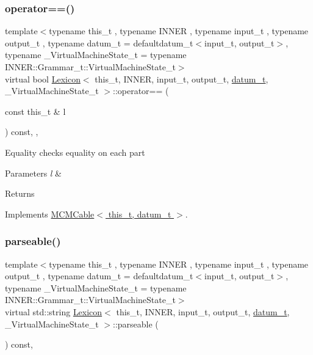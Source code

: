 \mbox{\label{class_lexicon_a04bde89f87b53ea3b283149f159dd35f}} 
\subsubsection{\texorpdfstring{operator==()}{operator==()}}
{\footnotesize\ttfamily template$<$typename this\+\_\+t , typename I\+N\+N\+ER , typename input\+\_\+t , typename output\+\_\+t , typename datum\+\_\+t  = defaultdatum\+\_\+t$<$input\+\_\+t, output\+\_\+t$>$, typename \+\_\+\+Virtual\+Machine\+State\+\_\+t  = typename I\+N\+N\+E\+R\+::\+Grammar\+\_\+t\+::\+Virtual\+Machine\+State\+\_\+t$>$ \\
virtual bool \hyperlink{class_lexicon}{Lexicon}$<$ this\+\_\+t, I\+N\+N\+ER, input\+\_\+t, output\+\_\+t, \hyperlink{class_bayesable_a9f1a6c0cd7855550fa10b1a8f13a5867}{datum\+\_\+t}, \+\_\+\+Virtual\+Machine\+State\+\_\+t $>$\+::operator== (\begin{DoxyParamCaption}\item[{const this\+\_\+t \&}]{l }\end{DoxyParamCaption}) const\hspace{0.3cm}{\ttfamily [inline]}, {\ttfamily [override]}, {\ttfamily [virtual]}}

Equality checks equality on each part 
\begin{DoxyParams}{Parameters}
{\em l} & \\
\hline
\end{DoxyParams}
\begin{DoxyReturn}{Returns}

\end{DoxyReturn}


Implements \hyperlink{class_m_c_m_cable_a7b35c04d3d1326b930cfc69dfe0bd207}{M\+C\+M\+Cable$<$ this\+\_\+t, datum\+\_\+t $>$}.

\mbox{\label{class_lexicon_aee7952473269abe7fc1cc0e2b96b8307}} 
\subsubsection{\texorpdfstring{parseable()}{parseable()}}
{\footnotesize\ttfamily template$<$typename this\+\_\+t , typename I\+N\+N\+ER , typename input\+\_\+t , typename output\+\_\+t , typename datum\+\_\+t  = defaultdatum\+\_\+t$<$input\+\_\+t, output\+\_\+t$>$, typename \+\_\+\+Virtual\+Machine\+State\+\_\+t  = typename I\+N\+N\+E\+R\+::\+Grammar\+\_\+t\+::\+Virtual\+Machine\+State\+\_\+t$>$ \\
virtual std\+::string \hyperlink{class_lexicon}{Lexicon}$<$ this\+\_\+t, I\+N\+N\+ER, input\+\_\+t, output\+\_\+t, \hyperlink{class_bayesable_a9f1a6c0cd7855550fa10b1a8f13a5867}{datum\+\_\+t}, \+\_\+\+Virtual\+Machine\+State\+\_\+t $>$\+::parseable (\begin{DoxyParamCaption}{ }\end{DoxyParamCaption}) const\hspace{0.3cm}{\ttfamily [inline]}, {\ttfamily [virtual]}}

